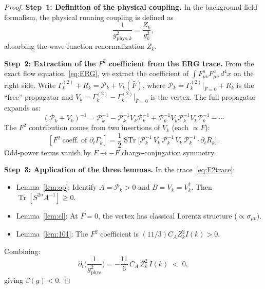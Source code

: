 \documentclass[12pt,a4paper]{article}
\theoremstyle{plain}
\theoremstyle{definition}
\theoremstyle{remark}
\begin{document}
\begin{proof}
\textbf{Step~1: Definition of the physical coupling.} In the background field formalism, the physical running coupling is defined as
\begin{equation}\label{eq:gphys}
\frac{1}{g_{\mathrm{phys},k}^2} = \frac{Z_k}{g_k^2},
\end{equation}
absorbing the wave function renormalization $Z_k$.

\textbf{Step~2: Extraction of the $F^2$ coefficient from the ERG trace.} From the exact flow equation~\eqref{eq:ERG}, we extract the coefficient of $\int F_{\mu\nu}^a F_{\mu\nu}^a\,d^4x$ on the right side. Write $\Gamma_k^{(2)}+R_k = \mathcal{P}_k+V_k(\bar{F})$, where $\mathcal{P}_k=\Gamma_k^{(2)}|_{\bar{F}=0}+R_k$ is the ``free'' propagator and $V_k=\Gamma_k^{(2)}-\Gamma_k^{(2)}|_{\bar{F}=0}$ is the vertex. The full propagator expands as:
\begin{equation}\label{eq:Neumann}
(\mathcal{P}_k+V_k)^{-1} = \mathcal{P}_k^{-1} - \mathcal{P}_k^{-1}V_k\mathcal{P}_k^{-1} + \mathcal{P}_k^{-1}V_k\mathcal{P}_k^{-1}V_k\mathcal{P}_k^{-1} - \cdots
\end{equation}
The $F^2$ contribution comes from two insertions of $V_k$ (each $\propto F$):
\begin{equation}\label{eq:F2trace}
[F^2\;\text{coeff. of }\partial_t\Gamma_k] = \frac{1}{2}\operatorname{STr}\big[\mathcal{P}_k^{-1}\,V_k\,\mathcal{P}_k^{-1}\,V_k\,\mathcal{P}_k^{-1}\cdot\partial_t R_k\big].
\end{equation}
Odd-power terms vanish by $F\to-F$ charge-conjugation symmetry.

\textbf{Step~3: Application of the three lemmas.} In the trace~\eqref{eq:F2trace}:
\begin{itemize}[nosep]
\item Lemma~\ref{lem:op}: Identify $A=\mathcal{P}_k>0$ and $B=V_k=V_k^\dagger$. Then $\operatorname{Tr}[S^{2n}A^{-1}]\geq 0$.
\item Lemma~\ref{lem:cl}: At $\bar{F}=0$, the vertex has classical Lorentz structure ($\propto\sigma_{\mu\nu}$).
\item Lemma~\ref{lem:101}: The $F^2$ coefficient is $(11/3)C_A Z_k^2 I(k)>0$.
\end{itemize}
Combining:
\begin{equation}\label{eq:betaflow}
\partial_t\!\bigg(\frac{1}{g_{\mathrm{phys}}^2}\bigg) = -\frac{11}{6}\,C_A\,Z_k^2\,I(k) \;<\; 0,
\end{equation}
giving $\beta(g)<0$.


\end{proof}
\end{document}
